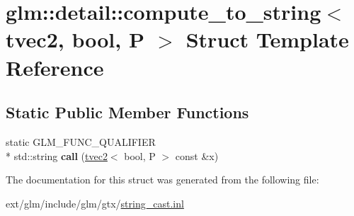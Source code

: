 \hypertarget{structglm_1_1detail_1_1compute__to__string_3_01tvec2_00_01bool_00_01_p_01_4}{\section{glm\-:\-:detail\-:\-:compute\-\_\-to\-\_\-string$<$ tvec2, bool, P $>$ Struct Template Reference}
\label{structglm_1_1detail_1_1compute__to__string_3_01tvec2_00_01bool_00_01_p_01_4}
}
\subsection*{Static Public Member Functions}
\begin{DoxyCompactItemize}
\item 
\hypertarget{structglm_1_1detail_1_1compute__to__string_3_01tvec2_00_01bool_00_01_p_01_4_a860277b13f804aa978482f1bed3de777}{static G\-L\-M\-\_\-\-F\-U\-N\-C\-\_\-\-Q\-U\-A\-L\-I\-F\-I\-E\-R \\*
std\-::string {\bfseries call} (\hyperlink{structglm_1_1tvec2}{tvec2}$<$ bool, P $>$ const \&x)}\label{structglm_1_1detail_1_1compute__to__string_3_01tvec2_00_01bool_00_01_p_01_4_a860277b13f804aa978482f1bed3de777}

\end{DoxyCompactItemize}


The documentation for this struct was generated from the following file\-:\begin{DoxyCompactItemize}
\item 
ext/glm/include/glm/gtx/\hyperlink{string__cast_8inl}{string\-\_\-cast.\-inl}\end{DoxyCompactItemize}
